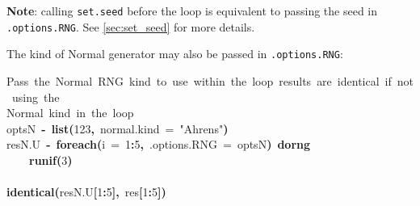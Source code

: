 \documentclass[a4paper,12pt]{article}\usepackage{graphicx, color}
\makeatletter
\newcommand{\hlnumber}[1]{\textcolor[rgb]{0,0,0}{#1}}%
\newcommand{\hlfunctioncall}[1]{\textcolor[rgb]{0.501960784313725,0,0.329411764705882}{\textbf{#1}}}%
\newcommand{\hlstring}[1]{\textcolor[rgb]{0.6,0.6,1}{#1}}%
\newcommand{\hlkeyword}[1]{\textcolor[rgb]{0,0,0}{\textbf{#1}}}%
\newcommand{\hlargument}[1]{\textcolor[rgb]{0.690196078431373,0.250980392156863,0.0196078431372549}{#1}}%
\newcommand{\hlcomment}[1]{\textcolor[rgb]{0.180392156862745,0.6,0.341176470588235}{#1}}%
\newcommand{\hlassignement}[1]{\textcolor[rgb]{0,0,0}{\textbf{#1}}}%
\newcommand{\hlsymbol}[1]{\textcolor[rgb]{0,0,0}{#1}}%
\newcommand{\hlstd}[1]{\textcolor[rgb]{0,0,0}{#1}}%
\newenvironment{kframe}{%
 \def\FrameCommand##1{\hskip\@totalleftmargin \hskip-\fboxsep
 \colorbox{shadecolor}{##1}\hskip-\fboxsep
     \hskip-\linewidth \hskip-\@totalleftmargin \hskip\columnwidth}%
 \MakeFramed {\advance\hsize-\width
   \@totalleftmargin\z@ \linewidth\hsize
   \@setminipage}}%
 {\par\unskip\endMakeFramed}
\newenvironment{knitrout}{}{} %
\renewenvironment{knitrout}{\begin{footnotesize}}{\end{footnotesize}}
\let\code=\texttt
\makeatother
\begin{document}
\begin{description}
\noindent \textbf{Note}: calling \code{set.seed} before the loop is equivalent 
to passing the seed in \code{.options.RNG}. 
See \cref{sec:set_seed} for more details.

\medskip
The kind of Normal generator may also be passed in \code{.options.RNG}:
\begin{knitrout}
\color{fgcolor}\begin{kframe}
\begin{flushleft}
\ttfamily\noindent
\hlcomment{\usebox{\hlnormalsizeboxhash}\usebox{\hlnormalsizeboxhash}{\ }Pass{\ }the{\ }Normal{\ }RNG{\ }kind{\ }to{\ }use{\ }within{\ }the{\ }loop{\ }results{\ }are{\ }identical{\ }if{\ }not{\ }using{\ }the}\hspace*{\fill}\\
\hlstd{}\hlcomment{\usebox{\hlnormalsizeboxhash}\usebox{\hlnormalsizeboxhash}{\ }Normal{\ }kind{\ }in{\ }the{\ }loop}\hspace*{\fill}\\
\hlstd{}\hlsymbol{optsN}{\ }\hlassignement{\usebox{\hlnormalsizeboxlessthan}-}{\ }\hlfunctioncall{list}\hlkeyword{(}\hlnumber{123}\hlkeyword{,}{\ }\hlargument{normal.kind}{\ }\hlargument{=}{\ }\hlstring{"{}Ahrens"{}}\hlkeyword{)}\hspace*{\fill}\\
\hlstd{}\hlsymbol{resN.U}{\ }\hlassignement{\usebox{\hlnormalsizeboxlessthan}-}{\ }\hlfunctioncall{foreach}\hlkeyword{(}\hlargument{i}{\ }\hlargument{=}{\ }\hlnumber{1}\hlkeyword{:}\hlnumber{5}\hlkeyword{,}{\ }\hlargument{.options.RNG}{\ }\hlargument{=}{\ }\hlsymbol{optsN}\hlkeyword{)}{\ }\hlkeyword{\usebox{\hlnormalsizeboxpercent}dorng\usebox{\hlnormalsizeboxpercent}}{\ }\hlkeyword{\usebox{\hlnormalsizeboxopenbrace}}\hspace*{\fill}\\
\hlstd{}{\ }{\ }{\ }{\ }\hlfunctioncall{runif}\hlkeyword{(}\hlnumber{3}\hlkeyword{)}\hspace*{\fill}\\
\hlstd{}\hlkeyword{\usebox{\hlnormalsizeboxclosebrace}}\hspace*{\fill}\\
\hlstd{}\hlfunctioncall{identical}\hlkeyword{(}\hlsymbol{resN.U}\hlkeyword{[}\hlnumber{1}\hlkeyword{:}\hlnumber{5}\hlkeyword{]}\hlkeyword{,}{\ }\hlsymbol{res}\hlkeyword{[}\hlnumber{1}\hlkeyword{:}\hlnumber{5}\hlkeyword{]}\hlkeyword{)}\mbox{}
\normalfont
\end{flushleft}
\begin{verbatim}

\end{verbatim}
\end{kframe}
\end{knitrout}
\end{description}
\end{document}
